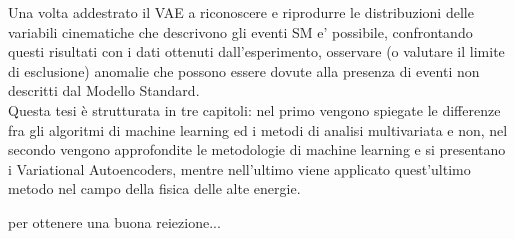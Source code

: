 Una volta addestrato il VAE a riconoscere e riprodurre le distribuzioni delle variabili cinematiche che descrivono gli eventi SM e' possibile, confrontando questi risultati con i dati ottenuti dall'esperimento, osservare (o valutare il limite di esclusione) anomalie che possono essere dovute alla presenza di eventi non descritti dal Modello Standard.\\
Questa tesi è strutturata in tre capitoli: nel primo vengono spiegate le differenze fra gli algoritmi di machine learning ed i metodi di analisi multivariata e non, nel secondo vengono approfondite le metodologie di machine learning e si presentano i Variational Autoencoders, mentre nell'ultimo viene applicato quest'ultimo metodo nel campo della fisica delle alte energie.


\color{red}
per ottenere una buona reiezione...\\
\color{black}

\newpage

